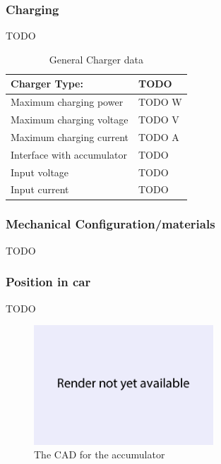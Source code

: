 \documentclass{article}
\begin{document}
\subsubsection{Charging}
TODO

	\begin{table}[H]
	    \centering
	    \begin{tabular}{|l|l|}
	        \hline
	        Charger Type: & TODO \\ \hline
	        Maximum charging power & TODO W \\ \hline
	        Maximum charging voltage & TODO V \\ \hline
	        Maximum charging current & TODO A \\ \hline
	        Interface with accumulator & TODO \\ \hline
	        Input voltage & TODO \\ \hline
	        Input current & TODO \\ \hline
	    \end{tabular}
	    \caption{General Charger data}
	    \label{charger}
	\end{table}

\subsubsection{Mechanical Configuration/materials}
TODO

\subsubsection{Position in car}
TODO

\begin{figure} [!ht]
	\centering  %
	
	\includegraphics[width=0.6\textwidth]{render_not_available.png}
	
	\caption{The CAD for the accumulator}
	
	\label{fig:accumulator_cad}
\end{figure}
\end{document}
